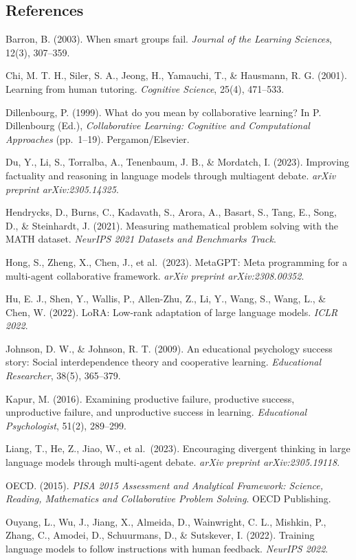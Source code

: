 \documentclass[
  11pt,
]{article}
\begin{document}
\subsection{References}\label{references}

Barron, B. (2003). When smart groups fail. \emph{Journal of the Learning
Sciences}, 12(3), 307--359.

Chi, M. T. H., Siler, S. A., Jeong, H., Yamauchi, T., \& Hausmann, R. G.
(2001). Learning from human tutoring. \emph{Cognitive Science}, 25(4),
471--533.

Dillenbourg, P. (1999). What do you mean by collaborative learning? In
P. Dillenbourg (Ed.), \emph{Collaborative Learning: Cognitive and
Computational Approaches} (pp.~1--19). Pergamon/Elsevier.

Du, Y., Li, S., Torralba, A., Tenenbaum, J. B., \& Mordatch, I. (2023).
Improving factuality and reasoning in language models through multiagent
debate. \emph{arXiv preprint arXiv:2305.14325}.

Hendrycks, D., Burns, C., Kadavath, S., Arora, A., Basart, S., Tang, E.,
Song, D., \& Steinhardt, J. (2021). Measuring mathematical problem
solving with the MATH dataset. \emph{NeurIPS 2021 Datasets and
Benchmarks Track}.

Hong, S., Zheng, X., Chen, J., et al.~(2023). MetaGPT: Meta programming
for a multi-agent collaborative framework. \emph{arXiv preprint
arXiv:2308.00352}.

Hu, E. J., Shen, Y., Wallis, P., Allen-Zhu, Z., Li, Y., Wang, S., Wang,
L., \& Chen, W. (2022). LoRA: Low-rank adaptation of large language
models. \emph{ICLR 2022}.

Johnson, D. W., \& Johnson, R. T. (2009). An educational psychology
success story: Social interdependence theory and cooperative learning.
\emph{Educational Researcher}, 38(5), 365--379.

Kapur, M. (2016). Examining productive failure, productive success,
unproductive failure, and unproductive success in learning.
\emph{Educational Psychologist}, 51(2), 289--299.

Liang, T., He, Z., Jiao, W., et al.~(2023). Encouraging divergent
thinking in large language models through multi-agent debate.
\emph{arXiv preprint arXiv:2305.19118}.

OECD. (2015). \emph{PISA 2015 Assessment and Analytical Framework:
Science, Reading, Mathematics and Collaborative Problem Solving}. OECD
Publishing.

Ouyang, L., Wu, J., Jiang, X., Almeida, D., Wainwright, C. L., Mishkin,
P., Zhang, C., Amodei, D., Schuurmans, D., \& Sutskever, I. (2022).
Training language models to follow instructions with human feedback.
\emph{NeurIPS 2022}.
\end{document}
